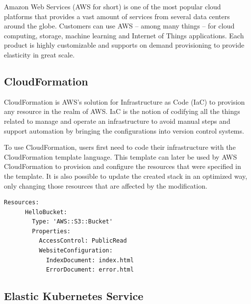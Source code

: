 Amazon Web Services (AWS for short) is one of the most popular cloud platforms that provides a vast amount of services from several data centers around the globe. Customers can use AWS -- among many things -- for cloud computing, storage, machine learning and Internet of Things applications. Each product is highly customizable and supports on demand provisioning to provide elasticity in great scale. \cite{AWSWhatIs}
\subsection{CloudFormation} \label{cloudformation}

CloudFormation is AWS's solution for Infrastructure as Code (IaC) to provision any resource in the realm of AWS. IaC is the notion of codifying all the things related to manage and operate an infrastructure to avoid manual steps and support automation by bringing the configurations into version control systems.

To use CloudFormation, users first need to code their infrastructure with the CloudFormation template language. This template can later be used by AWS CloudFormation to provision and configure the resources that were specified in the template. It is also possible to update the created stack in an optimized way, only changing those resources that are affected by the modification.

\vspace{0.5cm}
\begin{minipage}{\linewidth}
	\begin{lstlisting}[caption={Example CloudFormation template of an S3 bucket \cite{AWSCloudFormationExample}}, label={lst:aws-cf-bucket}]
	Resources:
	  HelloBucket:
	    Type: 'AWS::S3::Bucket'
	    Properties:
	      AccessControl: PublicRead
	      WebsiteConfiguration:
	        IndexDocument: index.html
	        ErrorDocument: error.html
	\end{lstlisting}
\end{minipage}

\subsection{Elastic Kubernetes Service}

